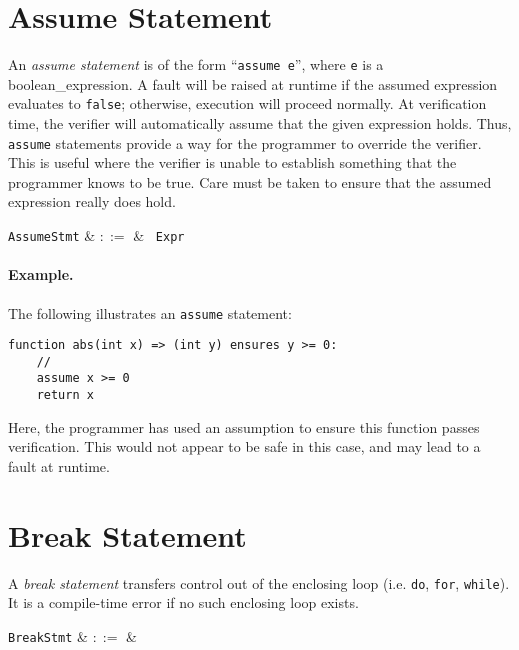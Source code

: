 \section{Assume Statement}

An {\em assume statement} is of the form ``\lstinline{assume e}'', where \lstinline{e} is a \gls{boolean_expression}.  A \gls{fault} will be raised at runtime if the assumed expression evaluates to \lstinline{false}; otherwise, execution will proceed normally.  At verification time, the verifier will automatically assume that the given expression holds.  Thus, \lstinline{assume} statements provide a way for the programmer to override the verifier.  This is useful where the verifier is unable to establish something that the programmer knows to be true.  Care must be taken to ensure that the assumed expression really does hold.

\begin{syntax}
  \verb+AssumeStmt+ & $::=$ & \ \verb+Expr+\\
\end{syntax}

\paragraph{Example.} The following illustrates an \lstinline{assume} statement:

\begin{lstlisting}
function abs(int x) => (int y) ensures y >= 0:
    //
    assume x >= 0
    return x
\end{lstlisting}
Here, the programmer has used an assumption to ensure this function passes verification.  This would not appear to be safe in this case, and may lead to a fault at runtime.


\section{Break Statement}
\label{c_stmts_break}
A {\em break statement} transfers control out of the enclosing loop (i.e. \lstinline{do}, \lstinline{for}, \lstinline{while}).  It is a compile-time error if no such enclosing loop exists.

\begin{syntax}
  \verb+BreakStmt+ & $::=$ & \\
\end{syntax}

